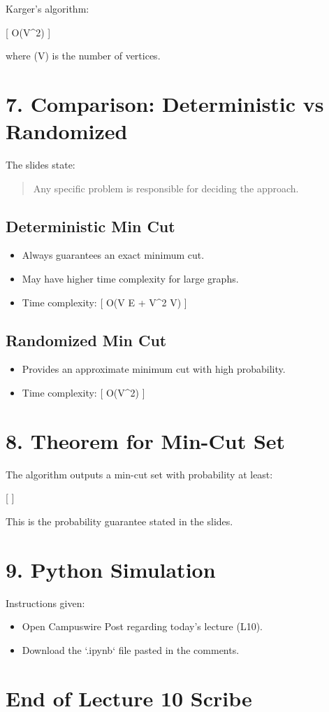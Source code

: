 \documentclass[12pt]{article}
\begin{document}
Karger’s algorithm:

[
O(V^2)
]

where (V) is the number of vertices.

\bigskip

\section*{7. Comparison: Deterministic vs Randomized}

The slides state:

\begin{quote}
Any specific problem is responsible for deciding the approach.
\end{quote}

\bigskip

\subsection*{Deterministic Min Cut}

\begin{itemize}
\item Always guarantees an exact minimum cut.
\item May have higher time complexity for large graphs.
\item Time complexity:
[
O(V \cdot E + V^2 \log V)
]
\end{itemize}

\bigskip

\subsection*{Randomized Min Cut}

\begin{itemize}
\item Provides an approximate minimum cut with high probability.
\item Time complexity:
[
O(V^2)
]
\end{itemize}

\bigskip

\section*{8. Theorem for Min-Cut Set}

The algorithm outputs a min-cut set with probability at least:

[
]

This is the probability guarantee stated in the slides.

\bigskip

\section*{9. Python Simulation}

Instructions given:

\begin{itemize}
\item Open Campuswire Post regarding today’s lecture (L10).
\item Download the `.ipynb` file pasted in the comments.
\end{itemize}

\bigskip

\section*{End of Lecture 10 Scribe}
\end{document}
